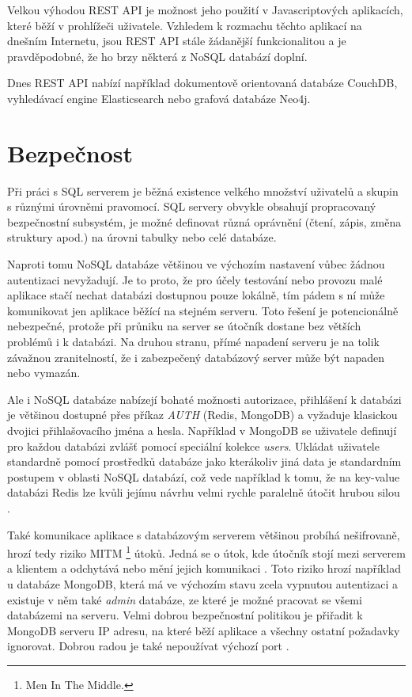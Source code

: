 Velkou výhodou REST API je možnost jeho použití v Javascriptových aplikacích, které běží v prohlížeči uživatele. Vzhledem k rozmachu těchto aplikací na dnešním Internetu, jsou REST API stále žádanější funkcionalitou a je pravděpodobné, že ho brzy některá z NoSQL databází doplní.

Dnes REST API nabízí například dokumentově orientovaná databáze CouchDB, vyhledávací engine Elasticsearch nebo grafová databáze Neo4j.

\section{Bezpečnost}
Při práci s SQL serverem je běžná existence velkého množství uživatelů a skupin s různými úrovněmi pravomocí. SQL servery obvykle obsahují propracovaný bezpečnostní subsystém, je možné definovat různá oprávnění (čtení, zápis, změna struktury apod.) na úrovni tabulky nebo celé databáze. 

Naproti tomu NoSQL databáze většinou ve výchozím nastavení vůbec žádnou autentizaci nevyžadují. Je to proto, že pro účely testování nebo provozu malé aplikace stačí nechat databázi dostupnou pouze lokálně, tím pádem s ní může komunikovat jen aplikace běžící na stejném serveru. Toto řešení je potencionálně nebezpečné, protože při průniku na server se útočník dostane bez větších problémů i k databázi. Na druhou stranu, přímé napadení serveru je na tolik závažnou zranitelností, že i zabezpečený databázový server může být napaden nebo vymazán.  

Ale i NoSQL databáze nabízejí bohaté možnosti autorizace, přihlášení k databázi je většinou dostupné přes příkaz \emph{AUTH} (Redis, MongoDB) a vyžaduje klasickou dvojici přihlašovacího jména a hesla. Například v MongoDB se uživatele definují pro každou databázi zvlášť pomocí speciální kolekce \emph{users}. Ukládat uživatele standardně pomocí prostředků databáze jako kterákoliv jiná data je standardním postupem v oblasti NoSQL databází, což vede například k tomu, že na key-value databázi Redis lze kvůli jejímu návrhu velmi rychle paralelně útočit hrubou silou \cite{redisBF}.

Také komunikace aplikace s databázovým serverem většinou probíhá nešifrovaně, hrozí tedy riziko MITM \footnote{Men In The Middle.} útoků. Jedná se o útok, kde útočník stojí mezi serverem a klientem a odchytává nebo mění jejich komunikaci \cite{mitm}. Toto riziko hrozí například u databáze MongoDB, která má ve výchozím stavu zcela vypnutou autentizaci a existuje v něm také \emph{admin} databáze, ze které je možné pracovat se všemi databázemi na serveru. Velmi dobrou bezpečnostní politikou je přiřadit k MongoDB serveru IP adresu, na které běží aplikace a všechny ostatní požadavky ignorovat. Dobrou radou je také nepoužívat výchozí port \cite{mongoHacking}.

